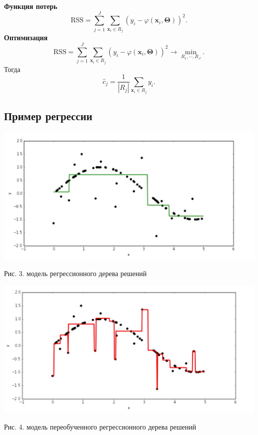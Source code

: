\documentclass{article}
\begin{document}
\noindent\textbf{Функция потерь}
\begin{equation}
	\text{RSS} = \sum\limits_{j=1}^{J} \sum\limits_{\textbf{x}_i \in R_j}^{} (y_i - \varphi(\textbf{x}_i, \bm{\Theta}))^2.
\end{equation}
\textbf{Оптимизация}
\begin{equation}
	\text{RSS} = \sum\limits_{j=1}^{J} \sum\limits_{\textbf{x}_i \in R_j}^{} (y_i - \varphi(\textbf{x}_i, \bm{\Theta}))^2 \to \underset{R_1, \cdots, R_J}{\min}.
\end{equation}
Тогда
\begin{equation}
	\hat{c}_j = \dfrac{1}{|R_j|} \sum\limits_{\textbf{x}_i \in R_j} y_i.
\end{equation}

\newpage

\subsection{Пример регрессии}

\begin{center}
	\includegraphics[scale=0.4]{pic31}
\end{center}
\begin{center}
	Рис. 3. модель регрессионного дерева решений
\end{center}
\begin{center}
	\includegraphics[scale=0.4]{pic32}
\end{center}
\begin{center}
	Рис. 4. модель переобученного регрессионного дерева решений
\end{center}
\end{document}
